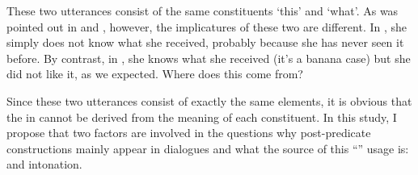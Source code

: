 These two utterances consist of the same constituents  `this' and  `what'.
As was pointed out in  and ,
however, the implicatures of these two are different.
In \LLast,
she simply does not know what she received,
probably because she has never seen it before.
By contrast, in \Last,
she knows what she received (it's a banana case) but she did not like it, as we expected.
Where does this  come from?

Since these two utterances consist of exactly the same elements,
it is obvious that the  in \Last cannot be derived from the meaning of each constituent. In this study, I propose that two factors are involved in the questions why post-predicate constructions mainly appear in dialogues and what the source of this ``'' usage is:
 and intonation.

